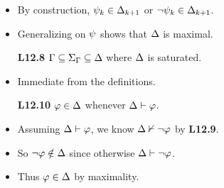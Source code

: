 \documentclass[a4paper, 11pt]{article} %
\begin{document}
\begin{itemize}
    \item By construction, $\psi_k \in \Delta_{k+1}$ or $\neg\psi_k \in \Delta_{k+1}$.
    \item Generalizing on $\psi$ shows that $\Delta$ is maximal.
  \item[\bf L12.8] $\Gamma\subseteq\Sigma_{\Gamma}\subseteq\Delta$ where $\Delta$ is saturated.
    \item Immediate from the definitions.
  \item[\bf L12.10] $\varphi\in\Delta$ whenever $\Delta\vdash\varphi$.
    \item Assuming $\Delta\vdash\varphi$, we know $\Delta\nvdash\neg\varphi$ by \textbf{L12.9}.
    \item So $\neg\varphi\notin\Delta$ since otherwise $\Delta\vdash\neg\varphi$.
    \item Thus $\varphi\in\Delta$ by maximality. 
\end{itemize}
\end{document}
